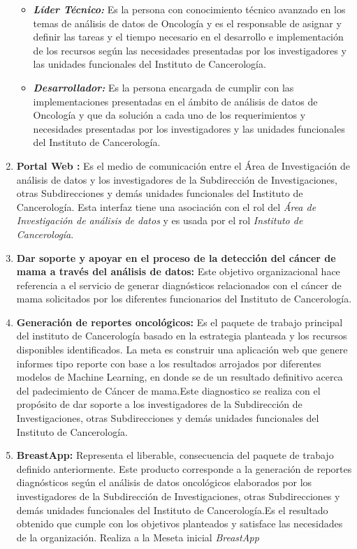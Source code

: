 \begin{enumerate}[label=\textbf{\arabic*})]
\begin{itemize}
		\item  \textbf{\textit{Líder Técnico:}}
		Es la persona con conocimiento técnico avanzado en los temas de análisis de datos de Oncología y es el  responsable de asignar y definir las  tareas y el tiempo necesario en el desarrollo e implementación de los recursos  según las necesidades presentadas por los investigadores y las unidades funcionales del Instituto  de Cancerología.
		
		\item  \textbf{\textit{Desarrollador:}}
		Es la persona encargada de cumplir con las implementaciones presentadas en el ámbito de análisis de datos de Oncología y que da  solución a cada uno de los requerimientos y necesidades presentadas por los  investigadores y las unidades funcionales del Instituto  de Cancerología.
	\end{itemize}
	
	\item  \textbf{Portal Web :} Es el medio de comunicación entre el Área de Investigación de análisis de datos  y los investigadores de la Subdirección de Investigaciones, otras Subdirecciones y demás unidades funcionales del Instituto  de Cancerología. Esta interfaz tiene una asociación con el rol del  \textit{Área de Investigación de análisis de datos}  y es usada por el rol \textit{Instituto  de Cancerología}.
	
	
	\item  \textbf{Dar soporte y apoyar en el proceso de la detección del cáncer de mama a través del análisis de datos:} Este objetivo organizacional hace referencia a el servicio de generar diagnósticos relacionados con el cáncer de mama  solicitados por los diferentes funcionarios del Instituto de Cancerología.
	
	\item  \textbf{Generación de reportes oncológicos:} Es el paquete de trabajo principal del instituto de Cancerología basado en la estrategia planteada y los recursos disponibles identificados. La meta es construir una  aplicación web que genere  informes tipo reporte con base a los resultados arrojados por  diferentes modelos de Machine Learning, en donde se de un resultado definitivo acerca del  padecimiento de Cáncer de mama.Este diagnostico se realiza con el propósito de dar soporte a los investigadores de la Subdirección de Investigaciones, otras Subdirecciones y demás unidades funcionales del Instituto  de Cancerología.
	
	\item  \textbf{BreastApp:} Representa el liberable, consecuencia del paquete de trabajo definido anteriormente. Este producto corresponde a la generación de reportes diagnósticos según el análisis de datos oncológicos elaborados por los investigadores de la Subdirección de Investigaciones, otras Subdirecciones y demás unidades funcionales del Instituto  de Cancerología.Es el resultado obtenido que cumple con los objetivos planteados y satisface las necesidades de la organización. Realiza a la Meseta inicial \textit{BreastApp}
	

\end{enumerate}
